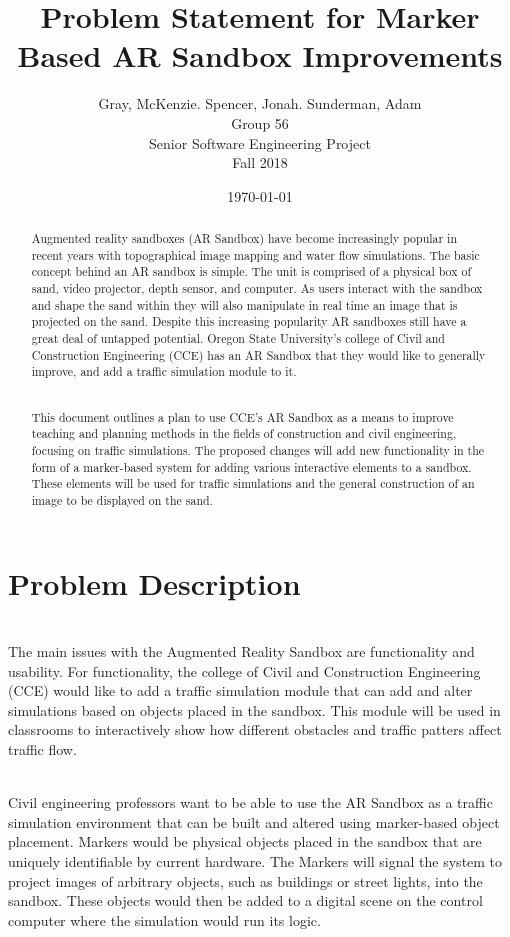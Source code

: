 \documentclass[letterpaper, 10pt, onecolumn, draftclsnofoot]{IEEEtran}
\title{Problem Statement for Marker Based AR Sandbox Improvements}
\author{Gray, McKenzie. Spencer, Jonah. Sunderman, Adam\\Group 56\\Senior Software Engineering Project\\Fall 2018}
\date{\today}
\begin{document}
\maketitle
\begin{abstract}
Augmented reality sandboxes (AR Sandbox) have become increasingly popular in recent years with topographical image mapping and water flow simulations. The basic concept behind an AR sandbox is simple. The unit is comprised of a physical box of sand, video projector, depth sensor, and computer. As users interact with the sandbox and shape the sand within they will also manipulate in real time an image that is projected on the sand. Despite this increasing popularity AR sandboxes still have a great deal of untapped potential. Oregon State University's college of Civil and Construction Engineering (CCE) has an AR Sandbox that they would like to generally improve, and add a traffic simulation module to it. 

\\

This document outlines a plan to use CCE's AR Sandbox as a means to improve teaching and planning methods in the fields of construction and civil engineering, focusing on traffic simulations. The proposed changes will add new functionality in the form of a marker-based system for adding various interactive elements to a sandbox. These elements will be used for traffic simulations and the general construction of an image to be displayed on the sand.
\end{abstract}
\newpage

\section{Problem Description} 

\\
The main issues with the Augmented Reality Sandbox are functionality and usability. For functionality, the college of Civil and Construction Engineering (CCE) would like to add a traffic simulation module that can add and alter simulations based on objects placed in the sandbox. This module will be used in classrooms to interactively show how different obstacles and traffic patters affect traffic flow. 

\\
Civil engineering professors want to be able to use the AR Sandbox as a traffic simulation environment that can be built and altered using marker-based object placement. Markers would be physical objects placed in the sandbox that are uniquely identifiable by current hardware. The Markers will signal the system to project images of arbitrary objects, such as buildings or street lights, into the sandbox. These objects would then be added to a digital scene on the control computer where the simulation would run its logic.
\end{document}
